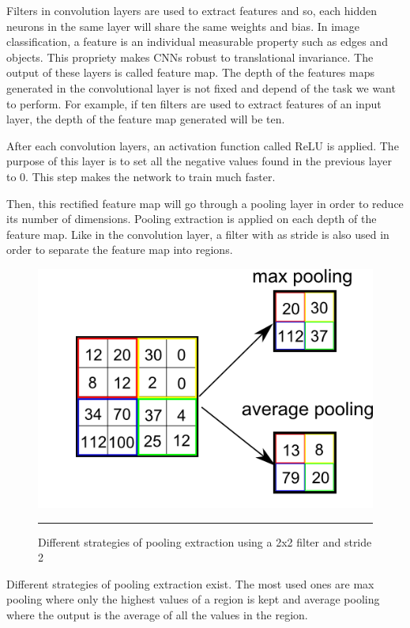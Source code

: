 Filters in convolution layers are used to extract features and so, each hidden neurons in the same layer will share the same weights and bias. In image classification, a feature is an individual measurable property such as edges and objects. This propriety makes CNNs robust to translational invariance. The output of these layers is called feature map. The depth of the features maps generated in the convolutional layer is not fixed and depend of the task we want to perform. For example, if ten filters are used to extract features of an input layer, the depth of the feature map generated will be ten. 

After each convolution layers, an activation function called ReLU is applied. The purpose of this layer is to set all the negative values found in the previous layer to 0. This step makes the network to train much faster.

Then, this rectified feature map will go through a pooling layer in order to reduce its number of dimensions. Pooling extraction is applied on each depth of the feature map. Like in the convolution layer, a filter with as stride is also used in order to separate the feature map into regions.

\begin{figure}[H]
  \centering
    \includegraphics[width=\textwidth]{Figures/pool.png}
    \rule{35em}{0.5pt}
  \caption[Schema of pooling extraction]{Different strategies of pooling extraction using a 2x2 filter and stride 2}
  \label{fig:Muli-layer perceptron}
\end{figure}

Different strategies of pooling extraction exist. The most used ones are max pooling where only the highest values of a region is kept and average pooling where the output is the average of all the values in the region. 

